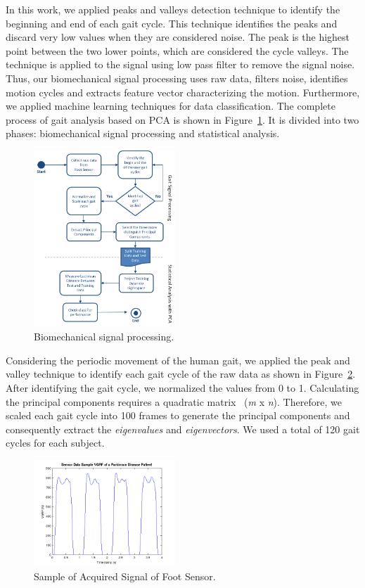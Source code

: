 \documentclass[10pt, conference, compsocconf]{IEEEtran}
\begin{document}
In this work, we applied peaks and valleys detection technique to identify the beginning and end of each gait cycle. This technique identifies the peaks and discard very low values when they are considered noise. The peak is the highest point between the two lower points, which are considered the cycle valleys. The technique is applied to the signal using low pass filter to remove the signal noise. Thus, our biomechanical signal processing uses raw data, filters noise, identifies motion cycles and extracts feature vector characterizing the motion. Furthermore, we applied machine learning techniques for data classification. The complete process of gait analysis based on PCA is shown in Figure~\ref{fig:biomecproc}. It is divided into two phases: biomechanical signal processing and statistical analysis. 

\begin{figure}[!htb]
	\centering
	\includegraphics[width=0.475\textwidth]{img/biomecanicalsignal.png}
	\caption{Biomechanical signal processing.}
	\label{fig:biomecproc}
\end{figure}


Considering the periodic movement of the human gait, we applied the peak and valley technique to identify each gait cycle of the raw data as shown in Figure~\ref{fig:peakvalley}. After identifying the gait cycle, we normalized the values from 0 to 1. Calculating the principal components requires a quadratic matrix~\cite{Shlens05atutorial} (\textit{m} x \textit{n}). Therefore, we scaled each gait cycle into 100 frames to generate the principal components and consequently extract the \textit{eigenvalues} and \textit{eigenvectors}. We used a total of 120 gait cycles for each subject.

\begin{figure}[!htb]
	\centering
	\includegraphics[width=0.475\textwidth]{img/sampleRawData.png}
	\caption{Sample of Acquired Signal of Foot Sensor.}
	\label{fig:peakvalley}
\end{figure}
\end{document}
